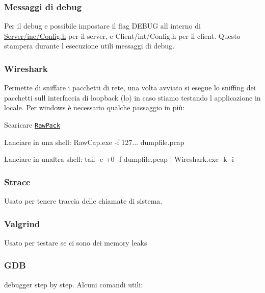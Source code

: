 \subsubsection*{Messaggi di debug}

Per il debug e\textquotesingle{} possibile impostare il flag D\+E\+B\+UG all\textquotesingle{} interno di \hyperlink{Server_2inc_2Config_8h}{Server/inc/\+Config.\+h} per il server, e Client/int/\+Config.\+h per il client. Questo stampera\textquotesingle{} durante l\textquotesingle{} esecuzione utili messaggi di debug.

\subsubsection*{Wireshark}

Permette di sniffare i pacchetti di rete, una volta avviato si esegue lo sniffing dei pacchetti sull\textquotesingle{} interfaccia di loopback (lo) in caso stiamo testando l\textquotesingle{} applicazione in locale. Per windows è necessario qualche passaggio in più\+:
\begin{DoxyEnumerate}
\item Scaricare \href{http://www.netresec.com/?page=RawCap}{\tt Raw\+Pack}
\item Lanciare in una shell\+: {\ttfamily Raw\+Cap.\+exe -\/f 127... dumpfile.\+pcap}
\item Lanciare in un\textquotesingle{}altra shell\+: {\ttfamily tail -\/c +0 -\/f dumpfile.\+pcap $\vert$ Wireshark.\+exe -\/k -\/i -\/}
\end{DoxyEnumerate}

\subsubsection*{Strace}

Usato per tenere traccia delle chiamate di sistema.

\subsubsection*{Valgrind}

Usato per testare se ci sono dei memory leaks

\subsubsection*{G\+DB}

debugger step by step. Alcuni comandi utili\+:


